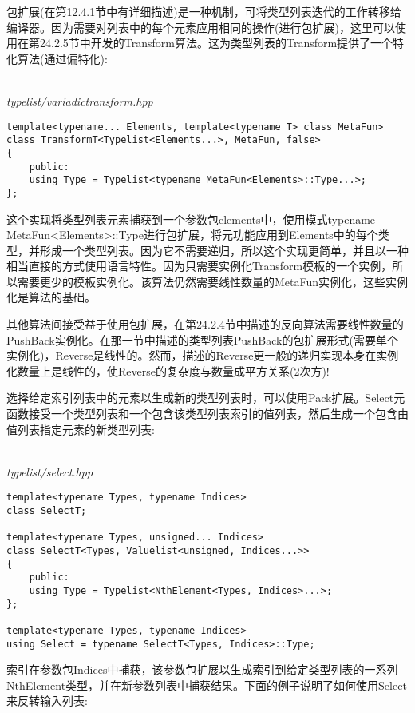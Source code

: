 包扩展(在第12.4.1节中有详细描述)是一种机制，可将类型列表迭代的工作转移给编译器。因为需要对列表中的每个元素应用相同的操作(进行包扩展)，这里可以使用在第24.2.5节中开发的Transform算法。这为类型列表的Transform提供了一个特化算法(通过偏特化):

\hspace*{\fill} \\ %
\noindent
\textit{typelist/variadictransform.hpp}
\begin{lstlisting}[style=styleCXX]
template<typename... Elements, template<typename T> class MetaFun>
class TransformT<Typelist<Elements...>, MetaFun, false>
{
	public:
	using Type = Typelist<typename MetaFun<Elements>::Type...>;
};
\end{lstlisting}

这个实现将类型列表元素捕获到一个参数包elements中，使用模式typename MetaFun<Elements>::Type进行包扩展，将元功能应用到Elements中的每个类型，并形成一个类型列表。因为它不需要递归，所以这个实现更简单，并且以一种相当直接的方式使用语言特性。因为只需要实例化Transform模板的一个实例，所以需要更少的模板实例化。该算法仍然需要线性数量的MetaFun实例化，这些实例化是算法的基础。

其他算法间接受益于使用包扩展，在第24.2.4节中描述的反向算法需要线性数量的PushBack实例化。在那一节中描述的类型列表PushBack的包扩展形式(需要单个实例化)，Reverse是线性的。然而，描述的Reverse更一般的递归实现本身在实例化数量上是线性的，使Reverse的复杂度与数量成平方关系(2次方)!

选择给定索引列表中的元素以生成新的类型列表时，可以使用Pack扩展。Select元函数接受一个类型列表和一个包含该类型列表索引的值列表，然后生成一个包含由值列表指定元素的新类型列表:

\hspace*{\fill} \\ %
\noindent
\textit{typelist/select.hpp}
\begin{lstlisting}[style=styleCXX]
template<typename Types, typename Indices>
class SelectT;

template<typename Types, unsigned... Indices>
class SelectT<Types, Valuelist<unsigned, Indices...>>
{
	public:
	using Type = Typelist<NthElement<Types, Indices>...>;
};

template<typename Types, typename Indices>
using Select = typename SelectT<Types, Indices>::Type;
\end{lstlisting}

索引在参数包Indices中捕获，该参数包扩展以生成索引到给定类型列表的一系列NthElement类型，并在新参数列表中捕获结果。下面的例子说明了如何使用Select来反转输入列表:

